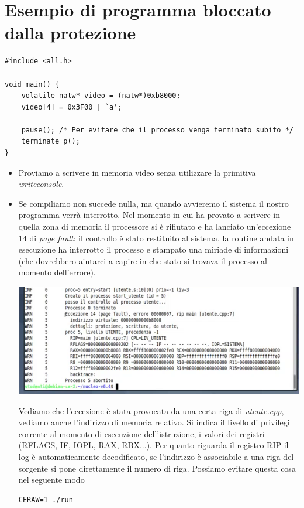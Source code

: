 \documentclass[11pt]{report}
\theoremstyle{definition}
\begin{document}
\section{Esempio di programma bloccato dalla protezione}
\small
\begin{verbatim}
#include <all.h>

void main() {
    volatile natw* video = (natw*)0xb8000;
    video[4] = 0x3F00 | `a';
    
    pause(); /* Per evitare che il processo venga terminato subito */
    terminate_p();
}
\end{verbatim}
\normalsize
\begin{itemize}
\item Proviamo a scrivere in memoria video senza utilizzare la primitiva \emph{writeconsole}.
\item Se compiliamo non succede nulla, ma quando avvieremo il sistema il nostro programma verrà interrotto. Nel momento in cui ha provato a scrivere in quella zona di memoria il processore si è rifiutato e ha lanciato un'eccezione 14 di \emph{page fault}: il controllo è stato restituito al sistema, la routine andata in esecuzione ha interrotto il processo e stampato una miriade di informazioni (che dovrebbero aiutarci a capire in che stato si trovava il processo al momento dell'errore).
\begin{center}\includegraphics[scale=.85]{img/125.PNG}\end{center}
Vediamo che l'eccezione è stata provocata da una certa riga di \emph{utente.cpp}, vediamo anche l'indirizzo di memoria relativo. Si indica il livello di privilegi corrente al momento di esecuzione dell'istruzione, i valori dei registri (RFLAGS, IF, IOPL, RAX, RBX...). Per quanto riguarda il registro RIP il log è automaticamente decodificato, se l'indirizzo è associabile a una riga del sorgente si pone direttamente il numero di riga. Possiamo evitare questa cosa nel seguente modo
\begin{verbatim}
CERAW=1 ./run
\end{verbatim}
\end{itemize}
\end{document}
